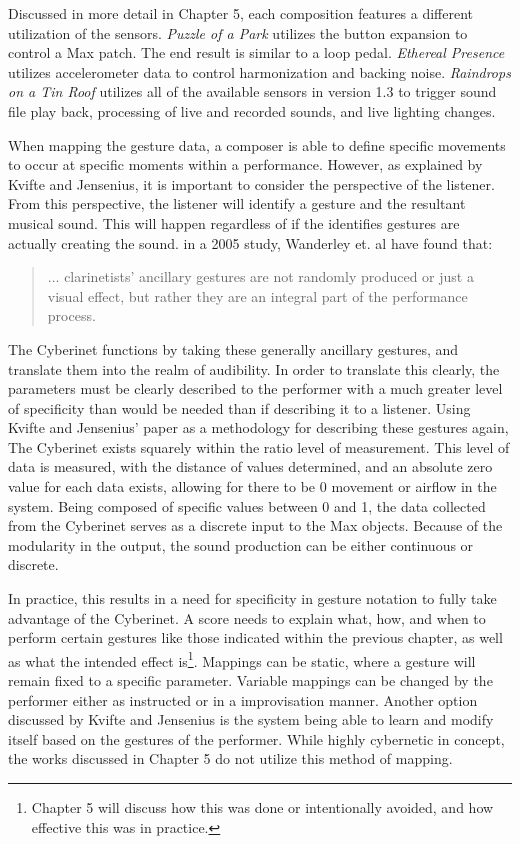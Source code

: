 Discussed in more detail in Chapter 5, each composition features a different utilization of the sensors. \textit{Puzzle of a Park} utilizes the button expansion to control a Max patch. The end result is similar to a loop pedal. \textit{Ethereal Presence} utilizes accelerometer data to control harmonization and backing noise. \textit{Raindrops on a Tin Roof} utilizes all of the available sensors in version 1.3 to trigger sound file play back, processing of live and recorded sounds, and live lighting changes.

When mapping the gesture data, a composer is able to define specific movements to occur at specific moments within a performance. However, as explained by Kvifte and Jensenius, it is important to consider the perspective of the listener\cite{KvifteJenseniusDescription}. From this perspective, the listener will identify a gesture and the resultant musical sound. This will happen regardless of if the identifies gestures are actually creating the sound. in a 2005 study, Wanderley et. al have found that:

\begin{quote}
    ... clarinetists' ancillary gestures are not randomly produced or just a visual effect, but rather they are an integral part of the performance process\cite{wanderleyClarinetGesture2005}.
\end{quote}

The Cyberinet functions by taking these generally ancillary gestures, and translate them into the realm of audibility. In order to translate this clearly, the parameters must be clearly described to the performer with a much greater level of specificity than would be needed than if describing it to a listener\cite{KvifteJenseniusDescription}. Using Kvifte and Jensenius' paper as a methodology for describing these gestures again, The Cyberinet exists squarely within the ratio level of measurement. This level of data is measured, with the distance of values determined, and an absolute zero value for each data exists, allowing for there to be 0 movement or airflow in the system. Being composed of specific values between 0 and 1, the data collected from the Cyberinet serves as a discrete input to the Max objects. Because of the modularity in the output, the sound production can be either continuous or discrete.

In practice, this results in a need for specificity in gesture notation to fully take advantage of the Cyberinet. A score needs to explain what, how, and when to perform certain gestures like those indicated within the previous chapter, as well as what the intended effect is\footnote{Chapter 5 will discuss how this was done or intentionally avoided, and how effective this was in practice.}. Mappings can be static, where a gesture will remain fixed to a specific parameter. Variable mappings can be changed by the performer either as instructed or in a improvisation manner. Another option discussed by Kvifte and Jensenius is the system being able to learn and modify itself based on the gestures of the performer\cite{KvifteJenseniusDescription}. While highly cybernetic in concept, the works discussed in Chapter 5 do not utilize this method of mapping.

